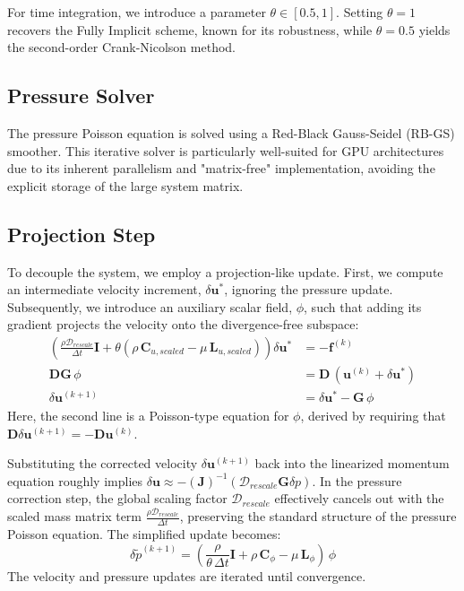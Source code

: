 \documentclass[preprint,12pt]{elsarticle}
\begin{document}
For time integration, we introduce a parameter $\theta \in [0.5, 1]$. Setting $\theta=1$ recovers the Fully Implicit scheme, known for its robustness, while $\theta=0.5$ yields the second-order Crank-Nicolson method.

\subsection{Pressure Solver}
The pressure Poisson equation is solved using a Red-Black Gauss-Seidel (RB-GS) smoother. This iterative solver is particularly well-suited for GPU architectures due to its inherent parallelism and "matrix-free" implementation, avoiding the explicit storage of the large system matrix.

\subsection{Projection Step}
To decouple the system, we employ a projection-like update. First, we compute an intermediate velocity increment, $\delta\mathbf{u}^*$, ignoring the pressure update. Subsequently, we introduce an auxiliary scalar field, $\phi$, such that adding its gradient projects the velocity onto the divergence-free subspace:
\begin{align}
    \left( \frac{\rho \mathcal{D}_{rescale}}{\Delta t} \mathbf{I} + \theta (\rho \, \mathbf{C}_{u,scaled} - \mu \, \mathbf{L}_{u,scaled}) \right) \delta \mathbf{u}^* &= - \mathbf{f}^{(k)} \\
    \mathbf{D} \mathbf{G} \, \phi &= \mathbf{D} \, (\mathbf{u}^{(k)} + \delta \mathbf{u}^*) \label{eq:pressure-poisson}\\
    \delta \mathbf{u}^{(k+1)} &= \delta \mathbf{u}^* - \mathbf{G} \, \phi
\end{align}
Here, the second line is a Poisson-type equation for $\phi$, derived by requiring that $\mathbf{D} \delta \mathbf{u}^{(k+1)} = -\mathbf{D} \mathbf{u}^{(k)}$.

Substituting the corrected velocity $\delta \mathbf{u}^{(k+1)}$ back into the linearized momentum equation roughly implies $\delta \mathbf{u} \approx - (\mathbf{J})^{-1} (\mathcal{D}_{rescale} \mathbf{G} \delta p)$. In the pressure correction step, the global scaling factor $\mathcal{D}_{rescale}$ effectively cancels out with the scaled mass matrix term $\frac{\rho \mathcal{D}_{rescale}}{\Delta t}$, preserving the standard structure of the pressure Poisson equation. The simplified update becomes:
\begin{equation}
    \delta \tilde{p}^{(k+1)} = \left( \frac{\rho}{\theta \, \Delta t} \mathbf{I} + \rho \, \mathbf{C}_\phi - \mu \, \mathbf{L}_\phi \right) \, \phi
    \label{eq:pressure_from_phi}
\end{equation}
The velocity and pressure updates are iterated until convergence.
\end{document}
